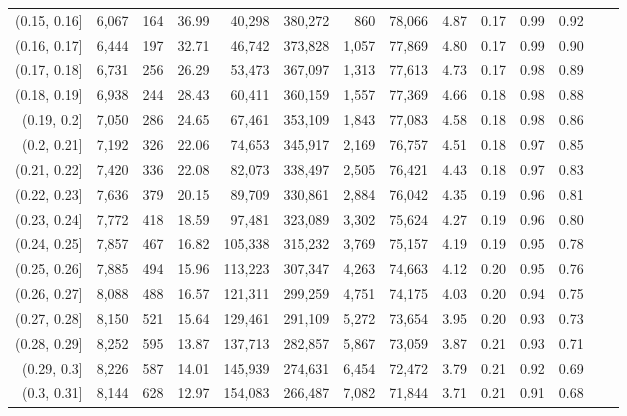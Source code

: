 \begin{tabular}{rrrrrrrrrrrrrr}
(0.15, 0.16]   &  6,067 &    164 &   36.99 &   40,298 &  380,272 &     860 &  78,066 &  4.87 &  0.17 &  0.99 &      0.92 \\
(0.16, 0.17]   &  6,444 &    197 &   32.71 &   46,742 &  373,828 &   1,057 &  77,869 &  4.80 &  0.17 &  0.99 &      0.90 \\
(0.17, 0.18]   &  6,731 &    256 &   26.29 &   53,473 &  367,097 &   1,313 &  77,613 &  4.73 &  0.17 &  0.98 &      0.89 \\
(0.18, 0.19]   &  6,938 &    244 &   28.43 &   60,411 &  360,159 &   1,557 &  77,369 &  4.66 &  0.18 &  0.98 &      0.88 \\
(0.19, 0.2]    &  7,050 &    286 &   24.65 &   67,461 &  353,109 &   1,843 &  77,083 &  4.58 &  0.18 &  0.98 &      0.86 \\
(0.2, 0.21]    &  7,192 &    326 &   22.06 &   74,653 &  345,917 &   2,169 &  76,757 &  4.51 &  0.18 &  0.97 &      0.85 \\
(0.21, 0.22]   &  7,420 &    336 &   22.08 &   82,073 &  338,497 &   2,505 &  76,421 &  4.43 &  0.18 &  0.97 &      0.83 \\
(0.22, 0.23]   &  7,636 &    379 &   20.15 &   89,709 &  330,861 &   2,884 &  76,042 &  4.35 &  0.19 &  0.96 &      0.81 \\
(0.23, 0.24]   &  7,772 &    418 &   18.59 &   97,481 &  323,089 &   3,302 &  75,624 &  4.27 &  0.19 &  0.96 &      0.80 \\
(0.24, 0.25]   &  7,857 &    467 &   16.82 &  105,338 &  315,232 &   3,769 &  75,157 &  4.19 &  0.19 &  0.95 &      0.78 \\
(0.25, 0.26]   &  7,885 &    494 &   15.96 &  113,223 &  307,347 &   4,263 &  74,663 &  4.12 &  0.20 &  0.95 &      0.76 \\
(0.26, 0.27]   &  8,088 &    488 &   16.57 &  121,311 &  299,259 &   4,751 &  74,175 &  4.03 &  0.20 &  0.94 &      0.75 \\
(0.27, 0.28]   &  8,150 &    521 &   15.64 &  129,461 &  291,109 &   5,272 &  73,654 &  3.95 &  0.20 &  0.93 &      0.73 \\
(0.28, 0.29]   &  8,252 &    595 &   13.87 &  137,713 &  282,857 &   5,867 &  73,059 &  3.87 &  0.21 &  0.93 &      0.71 \\
(0.29, 0.3]    &  8,226 &    587 &   14.01 &  145,939 &  274,631 &   6,454 &  72,472 &  3.79 &  0.21 &  0.92 &      0.69 \\
(0.3, 0.31]    &  8,144 &    628 &   12.97 &  154,083 &  266,487 &   7,082 &  71,844 &  3.71 &  0.21 &  0.91 &      0.68 \\

\end{tabular}
